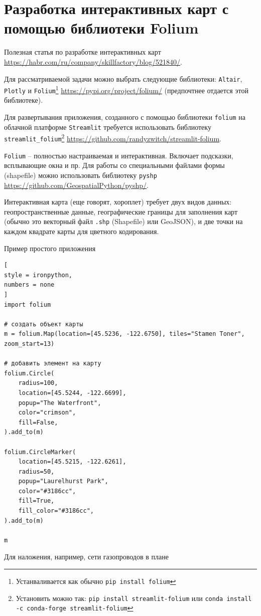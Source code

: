 \documentclass[%
	11pt,
	a4paper,
	utf8,
		]{article}
\begin{document}
\section{Разработка интерактивных карт с помощью библиотеки Folium}

Полезная статья по разработке интерактивных карт \url{https://habr.com/ru/company/skillfactory/blog/521840/}.

Для рассматриваемой задачи можно выбрать следующие библиотеки: \texttt{Altair}, \texttt{Plotly} и \texttt{Folium}\footnote{Устанваливается как обычно \texttt{pip install folium}} \url{https://pypi.org/project/folium/} (предпочтнее отдается этой библиотеке).

Для развертывания приложения, созданного с помощью библиотеки \texttt{folium} на облачной платформе \texttt{Streamlit} требуется использовать библиотеку \texttt{streamlit\_folium}\footnote{Установить можно так: \texttt{pip install streamlit-folium} или \texttt{conda install -c conda-forge streamlit-folium}} \url{https://github.com/randyzwitch/streamlit-folium}.

\texttt{Folium} -- полностью настраиваемая и интерактивная. Включает подсказки, всплывающие окна и пр. Для работы со специальными файлами формы (shapefile) можно использовать библиотеку \texttt{pyshp} \url{https://github.com/GeospatialPython/pyshp/}.

Интерактивная карта (еще говорят, хороплет) требует двух видов данных: геопространственные данные, географические границы для заполнения карт (обычно это векторный файл \texttt{.shp} (Shapefile) или GeoJSON), и две точки на каждом квадрате карты для цветного кодирования.

Пример простого приложения
\begin{lstlisting}[
style = ironpython,
numbers = none	
]
import folium

# создать объект карты
m = folium.Map(location=[45.5236, -122.6750], tiles="Stamen Toner", zoom_start=13)

# добавить элемент на карту
folium.Circle(
    radius=100,
    location=[45.5244, -122.6699],
    popup="The Waterfront",
    color="crimson",
    fill=False,
).add_to(m)

folium.CircleMarker(
    location=[45.5215, -122.6261],
    radius=50,
    popup="Laurelhurst Park",
    color="#3186cc",
    fill=True,
    fill_color="#3186cc",
).add_to(m)

m
\end{lstlisting}

Для наложения, например, сети газопроводов в плане
\end{document}
